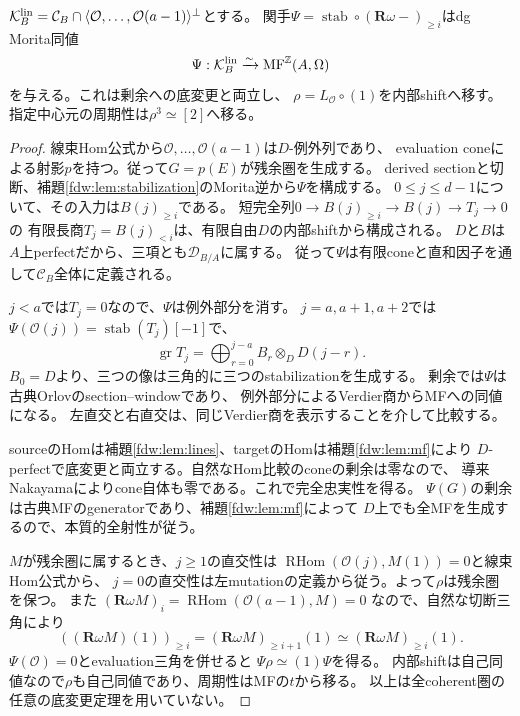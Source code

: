 \begin{theorem}\label{am:thm:comparison}
$\mathcal K_B^{\rm lin}=\mathcal C_B\cap
\langle\mathcal O,\ldots,\mathcal O(a-1)\rangle^\perp$とする。
関手$\Psi=\operatorname{stab}\circ(\mathbf R\omega-)_{\ge i}$はdg Morita同値
\[
 \Psi:\mathcal K_B^{\rm lin}\xrightarrow{\sim}\operatorname{MF}^{\mathbb Z}(A,\Omega)
\]
を与える。これは剰余への底変更と両立し、
$\rho=L_{\mathcal O}\circ(1)$を内部shiftへ移す。
指定中心元の周期性は$\rho^3\simeq[2]$へ移る。
\end{theorem}
\begin{proof}
線束Hom公式から$\mathcal O,\ldots,\mathcal O(a-1)$は$D$-例外列であり、
evaluation coneによる射影$p$を持つ。従って$G=p(E)$が残余圏を生成する。
derived sectionと切断、補題\ref{fdw:lem:stabilization}のMorita逆から$\Psi$を構成する。
$0\le j\le d-1$について、その入力は$B(j)_{\ge i}$である。
短完全列$0\to B(j)_{\ge i}\to B(j)\to T_j\to0$の
有限長商$T_j=B(j)_{<i}$は、有限自由$D$の内部shiftから構成される。
$D$と$B$は$A$上perfectだから、三項とも$\mathcal D_{B/A}$に属する。
従って$\Psi$は有限coneと直和因子を通して$\mathcal C_B$全体に定義される。

$j<a$では$T_j=0$なので、$\Psi$は例外部分を消す。
$j=a,a+1,a+2$では$\Psi(\mathcal O(j))=\operatorname{stab}(T_j)[-1]$で、
\[
 \operatorname{gr}T_j=\bigoplus_{r=0}^{j-a}B_r\otimes_DD(j-r).
\]
$B_0=D$より、三つの像は三角的に三つのstabilizationを生成する。
剰余では$\Psi$は古典Orlovのsection--windowであり、
例外部分によるVerdier商からMFへの同値になる\cite[Theorem~6.4]{BS}。
左直交と右直交は、同じVerdier商を表示することを介して比較する。

sourceのHomは補題\ref{fdw:lem:lines}、targetのHomは補題\ref{fdw:lem:mf}により
$D$-perfectで底変更と両立する。自然なHom比較のconeの剰余は零なので、
導来Nakayamaによりcone自体も零である。これで完全忠実性を得る。
$\Psi(G)$の剰余は古典MFのgeneratorであり、補題\ref{fdw:lem:mf}によって
$D$上でも全MFを生成するので、本質的全射性が従う。

$M$が残余圏に属するとき、$j\ge1$の直交性は
$\operatorname{RHom}(\mathcal O(j),M(1))=0$と線束Hom公式から、
$j=0$の直交性は左mutationの定義から従う。よって$\rho$は残余圏を保つ。
また
$(\mathbf R\omega M)_i=\operatorname{RHom}(\mathcal O(a-1),M)=0$
なので、自然な切断三角により
\[
 ((\mathbf R\omega M)(1))_{\ge i}
 =(\mathbf R\omega M)_{\ge i+1}(1)
 \simeq(\mathbf R\omega M)_{\ge i}(1).
\]
$\Psi(\mathcal O)=0$とevaluation三角を併せると
$\Psi\rho\simeq(1)\Psi$を得る。
内部shiftは自己同値なので$\rho$も自己同値であり、周期性はMFの$t$から移る。
以上は全coherent圏の任意の底変更定理を用いていない。
\end{proof}
